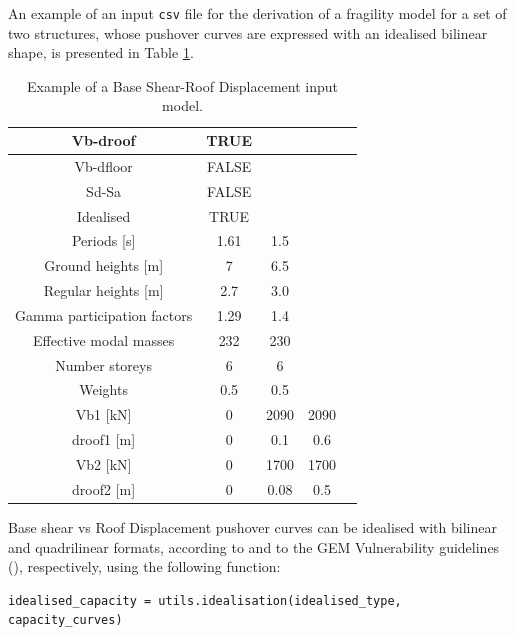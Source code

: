 An example of an input \verb=csv= file for the derivation of a fragility model for a set of two structures, whose pushover curves are expressed with an idealised bilinear shape, is presented in Table \ref{table:Vb-droof_input}.

\begin {table}[htb]
\caption{Example of a Base Shear-Roof Displacement input model.}
\label{table:Vb-droof_input}
\begin{center}
  \begin{tabular}{ | c | c | c | c | c |}
  \hline
    Vb-droof & TRUE &  &  \\ \hline
    Vb-dfloor & FALSE & & \\ \hline
    Sd-Sa & FALSE & & \\ \hline
    Idealised & TRUE & & \\ \hline
    Periods [s] & 1.61 & 1.5 & \\ \hline
    Ground heights [m] & 7 & 6.5 & \\ \hline
    Regular heights [m] & 2.7 & 3.0 & \\ \hline
    Gamma participation factors & 1.29 & 1.4 & \\ \hline
    Effective modal masses & 232 &	230 &  \\ \hline
    Number storeys & 6 & 6 & \\ \hline
    Weights & 0.5 & 0.5 & \\ \hline
    Vb1 [kN] & 0 & 2090 & 2090 \\ \hline
    droof1 [m] & 0 & 0.1 & 0.6 \\ \hline
    Vb2 [kN] & 0 & 1700 & 1700 \\ \hline
    droof2 [m] & 0 & 0.08 & 0.5 \\ \hline
  \end{tabular}
\end{center}
\end{table}

Base shear vs Roof Displacement pushover curves can be idealised with bilinear and quadrilinear formats, according to \citep{FEMA4402005} and to the GEM Vulnerability guidelines (\citep{Dayala2014}), respectively, using the following function:

\begin{Verbatim}[frame=single, commandchars=\\\{\}, samepage=true]
idealised_capacity = utils.idealisation(idealised_type, capacity_curves)
\end{Verbatim}


